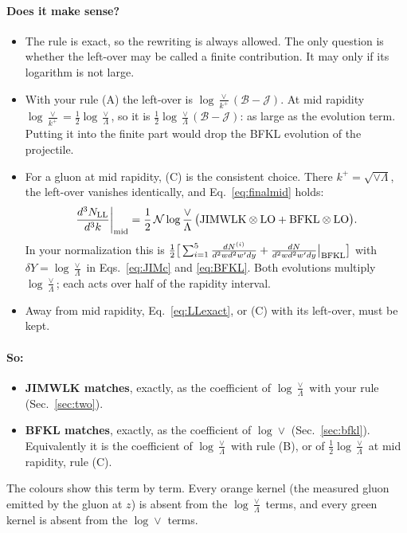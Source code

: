 \documentclass[10pt]{article}
\numberwithin{equation}{section}
\begin{document}
\paragraph{Does it make sense?}
\begin{itemize}
\item The rule is exact, so the rewriting is always allowed. The only question is whether the left-over may be called a finite contribution. It may only if its logarithm is not large.
\item With your rule (A) the left-over is $\log\frac{\vee}{k^+}(\mathcal B-\mathcal J)$. At mid rapidity $\log\frac{\vee}{k^+}=\frac12\log\frac{\vee}{\Lambda}$, so it is $\frac12\log\frac{\vee}{\Lambda}(\mathcal B-\mathcal J)$: as large as the evolution term. Putting it into the finite part would drop the BFKL evolution of the projectile.
\item For a gluon at mid rapidity, (C) is the consistent choice. There $k^+=\sqrt{\vee\Lambda}$, the left-over vanishes identically, and Eq.~\eqref{eq:finalmid} holds:
\begin{equation}
\frac{d^3N_{\rm LL}}{d^3k}\bigg|_{\rm mid}=\frac12\,\mathcal N\log\frac{\vee}{\Lambda}\,\big({\rm JIMWLK}\otimes{\rm LO}+{\rm BFKL}\otimes{\rm LO}\big).
\end{equation}
In your normalization this is $\frac12\big[\sum_{i=1}^5\frac{dN^{(i)}}{d^2wd^2w'dy}+\frac{dN}{d^2wd^2w'dy}\big|_{\rm BFKL}\big]$ with $\delta Y=\log\frac{\vee}{\Lambda}$ in Eqs.~\eqref{eq:JIMc} and \eqref{eq:BFKL}. Both evolutions multiply $\log\frac{\vee}{\Lambda}$; each acts over half of the rapidity interval.
\item Away from mid rapidity, Eq.~\eqref{eq:LLexact}, or (C) with its left-over, must be kept.
\end{itemize}
\paragraph{So:}
\begin{itemize}
\item \textbf{JIMWLK matches}, exactly, as the coefficient of $\log\frac{\vee}{\Lambda}$ with your rule (Sec.~\ref{sec:two}).
\item \textbf{BFKL matches}, exactly, as the coefficient of $\log\vee$ (Sec.~\ref{sec:bfkl}). Equivalently it is the coefficient of $\log\frac{\vee}{\Lambda}$ with rule (B), or of $\frac12\log\frac{\vee}{\Lambda}$ at mid rapidity, rule (C).
\end{itemize}
The colours show this term by term. Every {\color{BFK}orange} kernel (the measured gluon emitted by the gluon at $z$) is absent from the $\log\frac{\vee}{\Lambda}$ terms, and every {\color{JIM}green} kernel is absent from the $\log\vee$ terms.
\end{document}
